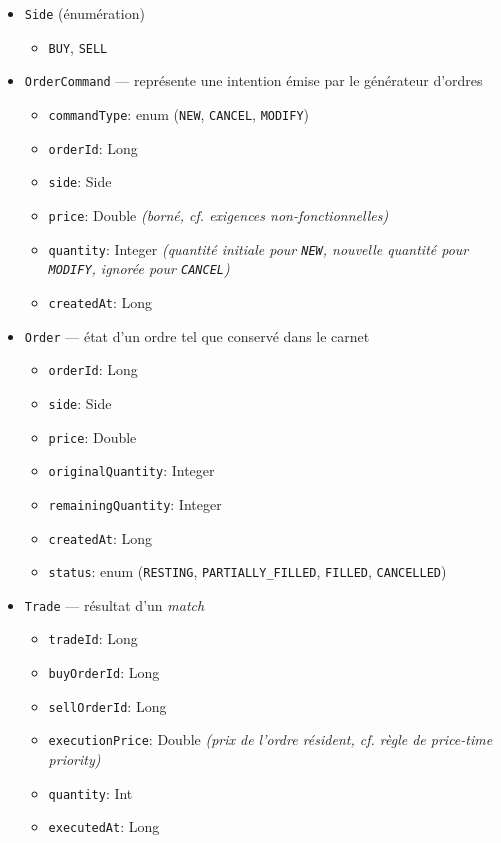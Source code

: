 \begin{itemize}
    \item \texttt{Side} (énumération)
        \begin{itemize}
            \item \texttt{BUY}, \texttt{SELL}
        \end{itemize}
    \item \texttt{OrderCommand} — représente une intention émise par le générateur d'ordres
        \begin{itemize}
            \item \texttt{commandType}: enum (\texttt{NEW}, \texttt{CANCEL}, \texttt{MODIFY})
            \item \texttt{orderId}: Long
            \item \texttt{side}: Side
            \item \texttt{price}: Double \textit{(borné, cf. exigences non-fonctionnelles)}
            \item \texttt{quantity}: Integer \textit{(quantité initiale pour \texttt{NEW}, nouvelle quantité pour \texttt{MODIFY}, ignorée pour \texttt{CANCEL})}
            \item \texttt{createdAt}: Long
        \end{itemize}
    \item \texttt{Order} — état d'un ordre tel que conservé dans le carnet
        \begin{itemize}
            \item \texttt{orderId}: Long
            \item \texttt{side}: Side
            \item \texttt{price}: Double
            \item \texttt{originalQuantity}: Integer
            \item \texttt{remainingQuantity}: Integer
            \item \texttt{createdAt}: Long
            \item \texttt{status}: enum (\texttt{RESTING}, \texttt{PARTIALLY\_FILLED}, \texttt{FILLED}, \texttt{CANCELLED})
        \end{itemize}
    \item \texttt{Trade} — résultat d'un \textit{match}
        \begin{itemize}
            \item \texttt{tradeId}: Long
            \item \texttt{buyOrderId}: Long
            \item \texttt{sellOrderId}: Long
            \item \texttt{executionPrice}: Double \textit{(prix de l'ordre résident, cf. règle de \textit{price-time priority})}
            \item \texttt{quantity}: Int
            \item \texttt{executedAt}: Long
        \end{itemize}
\end{itemize}

